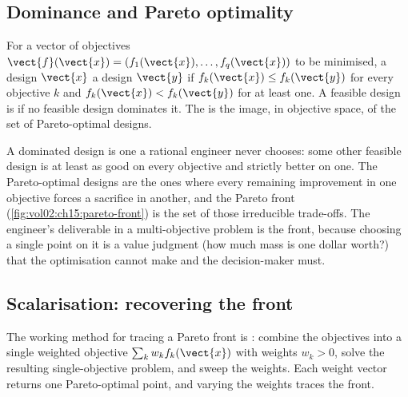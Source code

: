 \subsection{Dominance and Pareto optimality}

\begin{definition}
For a vector of objectives $\vect{f}(\vect{x}) = (f_{1}(\vect{x}),
\ldots, f_{q}(\vect{x}))$ to be minimised, a design $\vect{x}$
 a design $\vect{y}$ if $f_{k}(\vect{x}) \leq
f_{k}(\vect{y})$ for every objective $k$ and $f_{k}(\vect{x}) <
f_{k}(\vect{y})$ for at least one. A feasible design is
 if no feasible design dominates it. The
 is the image, in objective space, of the set of
Pareto-optimal designs.
\end{definition}

A dominated design is one a rational engineer never chooses: some other
feasible design is at least as good on every objective and strictly
better on one. The Pareto-optimal designs are the ones where every
remaining improvement in one objective forces a sacrifice in another,
and the Pareto front (\cref{fig:vol02:ch15:pareto-front}) is the set of
those irreducible trade-offs. The engineer's deliverable in a
multi-objective problem is the front, because choosing a single point
on it is a value judgment (how much mass is one dollar worth?) that the
optimisation cannot make and the decision-maker must.



\subsection{Scalarisation: recovering the front}

The working method for tracing a Pareto front is : combine the objectives into a single weighted objective
$\sum_{k} w_{k} f_{k}(\vect{x})$ with weights $w_{k} > 0$, solve the
resulting single-objective problem, and sweep the weights. Each weight
vector returns one Pareto-optimal point, and varying the weights traces
the front.

